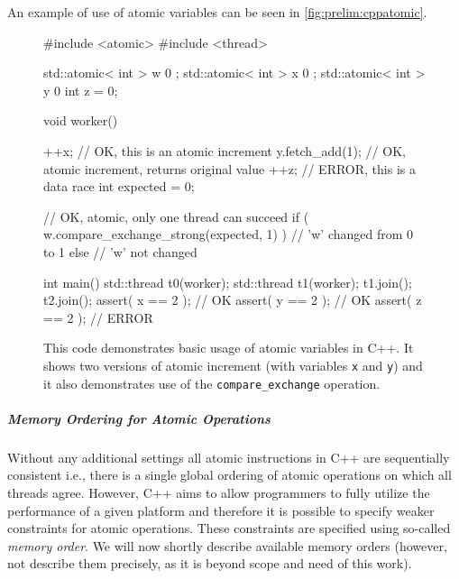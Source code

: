 An example of use of atomic variables can be seen in
\autoref{fig:prelim:cppatomic}.

\begin{figure}[tp]
    \begin{cppcode}
        #include <atomic>
        #include <thread>

        std::atomic< int > w { 0 };
        std::atomic< int > x { 0 };
        std::atomic< int > y { 0 }
        int z = 0;

        void worker() {
            ++x; // OK, this is an atomic increment
            y.fetch_add(1); // OK, atomic increment, returns original value
            ++z; // ERROR, this is a data race
            int expected = 0;

            // OK, atomic, only one thread can succeed
            if ( w.compare_exchange_strong(expected, 1) ) {
                // 'w' changed from 0 to 1
            } else {
                // 'w' not changed
            }
        }

        int main() {
            std::thread t0(worker);
            std::thread t1(worker);
            t1.join();
            t2.join();
            assert( x == 2 ); // OK
            assert( y == 2 ); // OK
            assert( z == 2 ); // ERROR
        }
    \end{cppcode}
    \caption{This code demonstrates basic usage of atomic variables in C++.
    It shows two versions of atomic increment (with variables \texttt{x} and
    \texttt{y}) and it also demonstrates use of the \texttt{compare\_exchange}
    operation.
    }\label{fig:prelim:cppatomic}
\end{figure}

\subparagraph{Memory Ordering for Atomic Operations} \label{sec:prelim:cppmemord}

Without any additional settings all atomic instructions in C++ are sequentially
consistent i.e., there is a single global ordering of atomic operations on
which all threads agree.
However, C++ aims to allow programmers to fully utilize the performance of a
given platform and therefore it is possible to specify weaker constraints for
atomic operations.
These constraints are specified using so-called \emph{memory order}.
We will now shortly describe available memory orders (however, not describe
them precisely, as it is beyond scope and need of this work).

